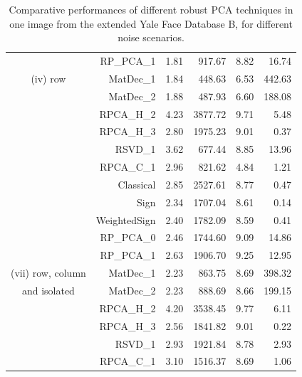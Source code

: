 \documentclass[ss]{imsart}
\theoremstyle{Example}
\begin{document}
\begin{table}[ht]
\begin{tabular}{c|rrrrr}
&   RP\_PCA\_1 & 1.81 & 917.67 & 8.82 & 16.74 \\ 
(iv) row &   MatDec\_1 & 1.84 & 448.63 & 6.53 & 442.63 \\ 
&   MatDec\_2 & 1.88 & 487.93 & 6.60 & 188.08 \\ 
&   RPCA\_H\_2 & 4.23 & 3877.72 & 9.71 & 5.48 \\ 
&   RPCA\_H\_3 & 2.80 & 1975.23 & 9.01 & 0.37 \\ 
&   RSVD\_1 & 3.62 & 677.44 & 8.85 & 13.96 \\ 
&   RPCA\_C\_1 & 2.96 & 821.62 & 4.84 & 1.21 \\ 
   \hline
& Classical & 2.85 & 2527.61 & 8.77 & 0.47 \\ 
&   Sign & 2.34 & 1707.04 & 8.61 & 0.14 \\ 
&   WeightedSign & 2.40 & 1782.09 & 8.59 & 0.41 \\ 
&   RP\_PCA\_0 & 2.46 & 1744.60 & 9.09 & 14.86 \\ 
&   RP\_PCA\_1 & 2.63 & 1906.70 & 9.25 & 12.95 \\ 
(vii) row, column &   MatDec\_1 & 2.23 & 863.75 & 8.69 & 398.32 \\ 
and isolated &   MatDec\_2 & 2.23 & 888.69 & 8.66 & 199.15 \\ 
&   RPCA\_H\_2 & 4.20 & 3538.45 & 9.77 & 6.11 \\ 
&   RPCA\_H\_3 & 2.56 & 1841.82 & 9.01 & 0.22 \\ 
&   RSVD\_1 & 2.93 & 1921.84 & 8.78 & 2.93 \\ 
&   RPCA\_C\_1 & 3.10 & 1516.37 & 8.69 & 1.06 \\ 
   \hline
\end{tabular}
\caption{Comparative performances of different robust PCA techniques in one image from the extended Yale Face Database B, for different noise scenarios.}
\label{Table:Image_Noise}
\end{table}
\end{document}
